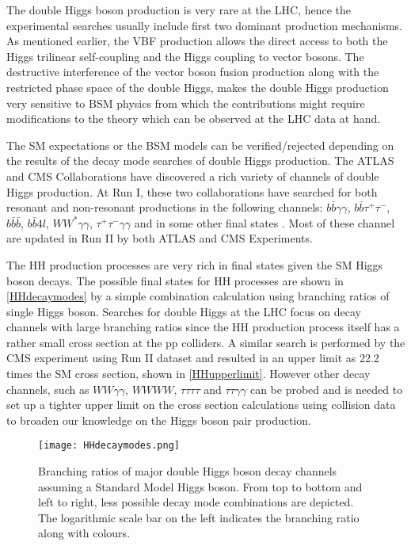 The double Higgs boson production is very rare at the LHC, hence the experimental searches usually include first two dominant production mechanisms. As mentioned earlier, the VBF production allows the direct access to both the Higgs trilinear self-coupling and the Higgs coupling to vector bosons. The destructive interference of the vector boson fusion production along with the restricted phase space of the double Higgs, makes the double Higgs production very sensitive to BSM physics from which the contributions might require modifications to the theory which can be observed at the LHC data at hand.

The SM expectations or the BSM models can be verified/rejected depending on the results of the decay mode searches of double Higgs production. The ATLAS and CMS Collaborations have discovered a rich variety of channels of double Higgs production. At Run I, these two collaborations have searched for both resonant and non-resonant productions in the following channels: $b\bar b\gamma\gamma$, $b\bar b\tau^+\tau^-$, $b\bar b\bar b$, $b\bar b4l$, $WW^*\gamma\gamma$, $\tau^+\tau^-\gamma\gamma$ and in some other final states \cite{pdg}. Most of these channel are updated in Run II by both ATLAS\cite{Aad2020} and CMS\cite{Sirunyan2019} Experiments.

The HH production processes are very rich in final states given the SM Higgs boson decays. The possible final states for HH processes are shown in \autoref{HHdecaymodes} by a simple combination calculation using branching ratios of single Higgs boson. Searches for double Higgs at the LHC focus on decay channels with large branching ratios since the HH production process itself has a rather small cross section at the pp colliders. A similar search is performed by the CMS experiment using Run II dataset and resulted in an upper limit as 22.2 times the SM cross section, shown in \autoref{HHupperlimit}. However other decay channels, such as $WW\gamma\gamma$, $WWWW$, $\tau\tau\tau\tau$ and $\tau\tau\gamma\gamma$ can be probed and is needed to set up a tighter upper limit on the cross section calculations using collision data to broaden our knowledge on the Higgs boson pair production. 

\begin{figure}[ht]
	\centering
	\texttt{[image: HHdecaymodes.png]}
	\vspace{2mm}
	\caption[Branching ratio of major double Higgs boson decay channels assuming a Standard Model Higgs boson. From top to bottom and left to right, less possible decay mode combinations are depicted. The logarithmic scale bar on the left indicates the branching ratio along with colours.]
	{Branching ratios of major double Higgs boson decay channels assuming a Standard Model Higgs boson\cite{Gouzevitch2020}. From top to bottom and left to right, less possible decay mode combinations are depicted. The logarithmic scale bar on the left indicates the branching ratio along with colours.}
	\label{HHdecaymodes}
\end{figure}

